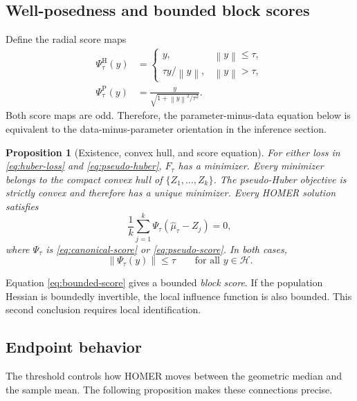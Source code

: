 \documentclass[twoside]{article}
\newtheorem{proposition}[theorem]{Proposition}
\theoremstyle{definition}
\newcommand{\Hcal}{\mathcal H}
\newcommand{\norm}[1]{\left\lVert #1\right\rVert}
\begin{document}
\subsection{Well-posedness and bounded block scores}

Define the radial score maps
\begin{align}
    \Psi^{\mathrm H}_\tau(y)
    &=\begin{cases}
        y, & \norm y\le\tau,\\
        \tau y/\norm y, & \norm y>\tau,
      \end{cases}\label{eq:canonical-score}\\
    \Psi^{\mathrm P}_\tau(y)
    &=\frac{y}{\sqrt{1+\norm y^2/\tau^2}}.\label{eq:pseudo-score}
\end{align}
Both score maps are odd. Therefore, the parameter-minus-data equation below is equivalent to the data-minus-parameter orientation in the inference section.

\begin{proposition}[Existence, convex hull, and score equation]\label{prop:existence}
For either loss in \eqref{eq:huber-loss} and \eqref{eq:pseudo-huber}, $F_\tau$ has a minimizer. Every minimizer belongs to the compact convex hull of $\{Z_1,\ldots,Z_k\}$. The pseudo-Huber objective is strictly convex and therefore has a unique minimizer. Every HOMER solution satisfies
\begin{equation}\label{eq:score}
    \frac1k\sum_{j=1}^k
    \Psi_\tau(\hat\mu_\tau-Z_j)=0,
\end{equation}
where $\Psi_\tau$ is \eqref{eq:canonical-score} or \eqref{eq:pseudo-score}. In both cases,
\begin{equation}\label{eq:bounded-score}
    \norm{\Psi_\tau(y)}\le\tau\qquad\text{for all }y\in\Hcal.
\end{equation}
\end{proposition}

Equation \eqref{eq:bounded-score} gives a bounded \emph{block score}. If the population Hessian is boundedly invertible, the local influence function is also bounded. This second conclusion requires local identification.





\subsection{Endpoint behavior}

The threshold controls how HOMER moves between the geometric median and the sample mean. The following proposition makes these connections precise.
\end{document}
